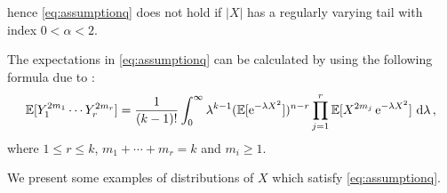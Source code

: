 hence \eqref{eq:assumptionq} does not hold if $|X|$ has a regularly varying tail with index $0<\alpha<2$.
\par

The expectations in \eqref{eq:assumptionq} can be calculated by using the following formula due to 
\cite{gine:goetze:mason:1997}:
\begin{equation}\label{eq:formulagine}
\mathbb{E}[ Y_{1}^{2m_1}\cdots Y_{r}^{2m_r} ] = \frac{1}{(k-1)!} \int_0^{\infty} 
\lambda^{k-1} (\mathbb{E}[\operatorname{e}^{-\lambda X^2}])^{n-r}  \prod_{j=1}^r \mathbb{E}[X^{2m_j}\operatorname{e}^{-\lambda X^2} ] \, \,\mathrm{d} \lambda\,,
\end{equation}
where $1\le r\le k$, $m_1+\cdots+m_r=k$ and $m_i\ge 1$.
\par
We present some examples of distributions of $X$  which satisfy \eqref{eq:assumptionq}. %

